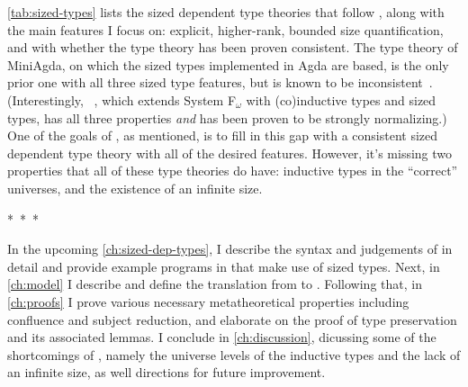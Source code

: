 \cref{tab:sized-types} lists the sized dependent type theories that follow \CIChat,
along with the main features I focus on:
explicit, higher-rank, bounded size quantification,
and with whether the type theory has been proven consistent.
The type theory of MiniAgda, on which the sized types implemented in Agda are based,
is the only prior one with all three sized type features,
but is known to be inconsistent~\citep{infinity}.
(Interestingly, \Fcopomega~\citep{F-omega-cop}, which extends System F$_\omega$ with (co)inductive types and sized types,
has all three properties \emph{and} has been proven to be strongly normalizing.)
One of the goals of \lang, as mentioned, is to fill in this gap
with a consistent sized dependent type theory with all of the desired features.
However, it's missing two properties that all of these type theories do have:
inductive types in the ``correct'' universes,
and the existence of an infinite size.


\begin{center}
\mbox{* * *}
\end{center}
\vspace*{-0.5\baselineskip}

\noindent In the upcoming \cref{ch:sized-dep-types}, I describe the syntax and judgements of \lang in detail
and provide example programs in \lang that make use of sized types.
Next, in \cref{ch:model} I describe \CICE and define the translation from \lang to \CICE.
Following that, in \cref{ch:proofs} I prove various necessary metatheoretical properties
including confluence and subject reduction,
and elaborate on the proof of type preservation and its associated lemmas.
I conclude in \cref{ch:discussion}, dicussing some of the shortcomings of \lang,
namely the universe levels of the inductive types and the lack of an infinite size,
as well directions for future improvement.